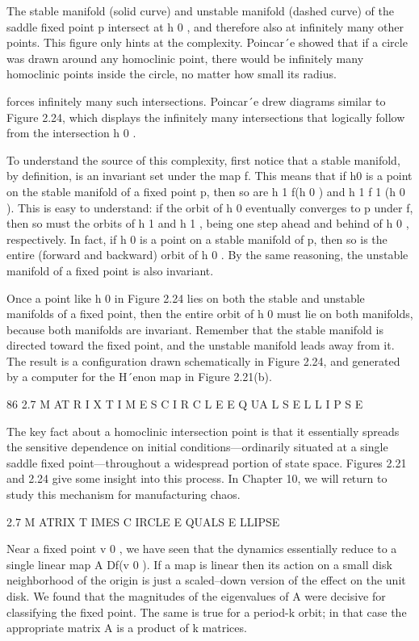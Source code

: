 \documentclass[12pt]{article}
\begin{document}
The stable manifold (solid curve) and unstable manifold (dashed curve) of the saddle ﬁxed point p intersect at h 0 , and therefore 
also at inﬁnitely many other points. This ﬁgure only hints at the complexity. Poincar´e showed that if a circle was drawn around 
any homoclinic point, there would be inﬁnitely many homoclinic points inside the circle, no matter how small its radius.

forces inﬁnitely many such intersections. Poincar´e drew diagrams similar to Figure 2.24, which displays the inﬁnitely many 
intersections that logically follow from the intersection h 0 .

To understand the source of this complexity, ﬁrst notice that a stable manifold, by deﬁnition, is an invariant set under the map f. 
This means that if h0  is a point on the stable manifold of a ﬁxed point p, then so are h 1  f(h 0 ) and h 1  f 1 (h 0 ). This is 
easy to understand: if the orbit of h 0 eventually converges to p under f, then so must the orbits of h 1 and h 1 , being one step 
ahead and behind of h 0 , respectively. In fact, if h 0 is a point on a stable manifold of p, then so is the entire (forward and 
backward) orbit of h 0 . By the same reasoning, the unstable manifold of a ﬁxed point is also invariant.

Once a point like h 0 in Figure 2.24 lies on both the stable and unstable manifolds of a ﬁxed point, then the entire orbit of h 0 
must lie on both manifolds, because both manifolds are invariant. Remember that the stable manifold is directed toward the ﬁxed 
point, and the unstable manifold leads away from it. The result is a conﬁguration drawn schematically in Figure 2.24, and generated 
by a computer for the H´enon map in Figure 2.21(b).

86 2.7 M AT R I X T I M E S C I R C L E E Q UA L S E L L I P S E

The key fact about a homoclinic intersection point is that it essentially spreads the sensitive dependence on initial 
conditions—ordinarily situated at a single saddle ﬁxed point—throughout a widespread portion of state space. Figures 2.21 and 2.24 
give some insight into this process. In Chapter 10, we will return to study this mechanism for manufacturing chaos.

2.7 M ATRIX T IMES C IRCLE E QUALS E LLIPSE

Near a ﬁxed point v 0 , we have seen that the dynamics essentially reduce to a single linear map A  Df(v 0 ). If a map is linear 
then its action on a small disk neighborhood of the origin is just a scaled–down version of the effect on the unit disk. We found 
that the magnitudes of the eigenvalues of A were decisive for classifying the ﬁxed point. The same is true for a period-k orbit; in 
that case the appropriate matrix A is a product of k matrices.
\end{document}
